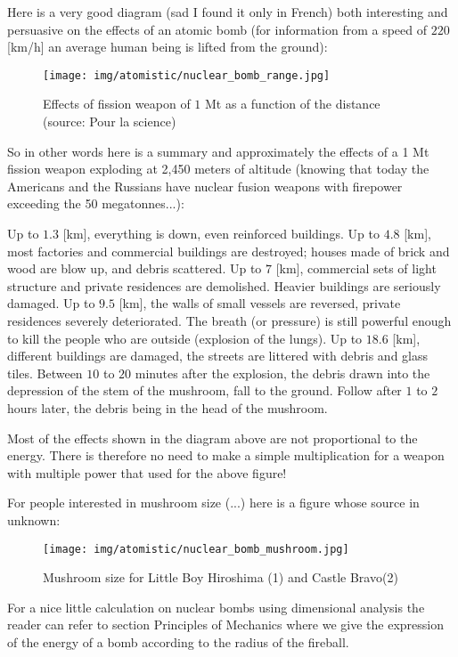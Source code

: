 	Here is a very good diagram (sad I found it only in French) both interesting and persuasive on the effects of an atomic bomb (for information from a speed of $220$ [km/h] an average human being is lifted from the ground):
	\begin{figure}[H]
		\begin{center}
		\texttt{[image: img/atomistic/nuclear\_bomb\_range.jpg]}
		\end{center}	
		\caption{Effects of fission weapon of $1$ Mt as a function of the distance (source: Pour la science)}
	\end{figure}
	So in other words here is a summary and approximately the effects of a 1 Mt fission weapon exploding at 2,450 meters of altitude (knowing that today the Americans and the Russians have nuclear fusion weapons with firepower exceeding the 50 megatonnes...):
	
	Up to $1.3$ [km], everything is down, even reinforced buildings. Up to $4.8$ [km], most factories and commercial buildings are destroyed; houses made of brick and wood are blow up, and debris scattered. Up to $7$ [km], commercial sets of light structure and private residences are demolished. Heavier buildings are seriously damaged. Up to $9.5$ [km], the walls of small vessels are reversed, private residences severely deteriorated. The breath (or pressure) is still powerful enough to kill the people who are outside (explosion of the lungs). Up to $18.6$ [km], different buildings are damaged, the streets are littered with debris and glass tiles. Between $10$ to $20$ minutes after the explosion, the debris drawn into the depression of the stem of the mushroom, fall to the ground. Follow after $1$ to $2$ hours later, the debris being in the head of the mushroom.
	
	Most of the effects shown in the diagram above are not proportional to the energy. There is therefore no need to make a simple multiplication for a weapon with multiple power that used for the above figure!
	
	For people interested in mushroom size (...) here is a figure whose source in unknown:
	\begin{figure}[H]
		\begin{center}
		\texttt{[image: img/atomistic/nuclear\_bomb\_mushroom.jpg]}
		\end{center}	
		\caption{Mushroom size for Little Boy Hiroshima (1) and Castle Bravo(2)}
	\end{figure}
	\begin{tcolorbox}[title=Remark,colframe=black,arc=10pt]
	For a nice little calculation on nuclear bombs using dimensional analysis the reader can refer to section Principles of Mechanics where we give the expression of the energy of a bomb according to the radius of the fireball.
	\end{tcolorbox}
	
